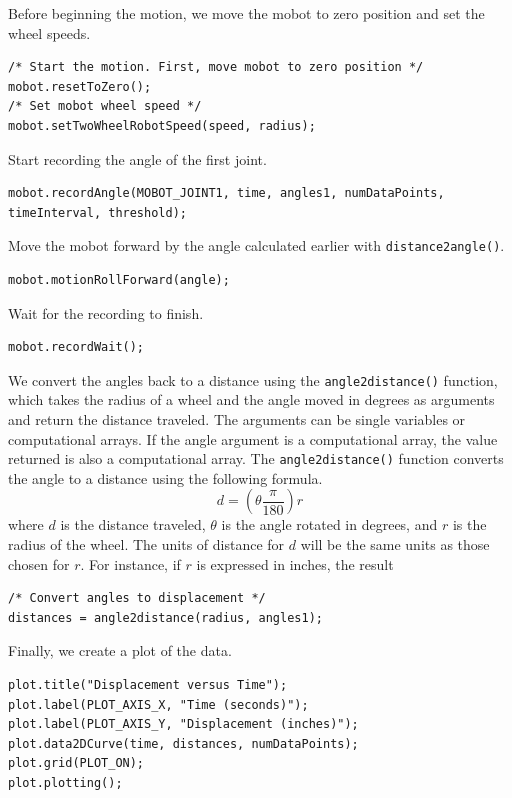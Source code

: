 \documentclass{article}
\begin{document}
Before beginning the motion, we move the mobot to zero position and set the 
wheel speeds.
\begin{verbatim}
/* Start the motion. First, move mobot to zero position */
mobot.resetToZero();
/* Set mobot wheel speed */
mobot.setTwoWheelRobotSpeed(speed, radius);
\end{verbatim}

Start recording the angle of the first joint.
\begin{verbatim}
mobot.recordAngle(MOBOT_JOINT1, time, angles1, numDataPoints, timeInterval, threshold);
\end{verbatim}

Move the mobot forward by the angle calculated earlier with \texttt{distance2angle()}.
\begin{verbatim}
mobot.motionRollForward(angle);
\end{verbatim}

Wait for the recording to finish.
\begin{verbatim}
mobot.recordWait();
\end{verbatim}

We convert the angles back to a distance using the \texttt{angle2distance()} function,
which takes the radius of a wheel and the angle moved in degrees as arguments and
return the distance traveled. The arguments can be single variables or computational
arrays. If the angle argument is a computational array, the value returned is also
a computational array. The \texttt{angle2distance()} function converts the angle
to a distance using the following formula.
\begin{equation*}
d = \left(\theta \frac{\pi}{180}\right) r
\end{equation*}
where $d$ is the distance traveled, $\theta$ is the angle rotated in degrees, and $r$ is the
radius of the wheel. The units of distance for $d$ will be the same units as those
chosen for $r$. For instance, if $r$ is expressed in inches, the result 

\begin{verbatim}
/* Convert angles to displacement */
distances = angle2distance(radius, angles1);
\end{verbatim}

Finally, we create a plot of the data.
\begin{verbatim}
plot.title("Displacement versus Time");
plot.label(PLOT_AXIS_X, "Time (seconds)");
plot.label(PLOT_AXIS_Y, "Displacement (inches)");
plot.data2DCurve(time, distances, numDataPoints);
plot.grid(PLOT_ON);
plot.plotting();
\end{verbatim}
\end{document}

